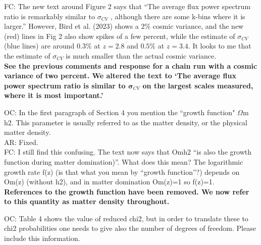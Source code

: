 \documentclass[12pt]{article}
\begin{document}
FC: The new text around Figure 2 says that “The average flux power spectrum ratio is remarkably similar to $\sigma_{CV}$ , although there are some k-bins where it is larger.” However, Bird et al. (2023) shows a $2\%$ cosmic variance, and the new (red) lines in Fig 2 also show spikes of a few percent, while the estimate of $\sigma_{CV}$ (blue lines) are around $0.3\%$ at $z=2.8$ and $0.5\%$ at $z=3.4$. It looks to me that the estimate of $\sigma_{CV}$ is much smaller than the actual cosmic variance.\\

\textbf{See the previous comments and response for a chain run with a cosmic variance of two percent. We altered the text to `The average flux power spectrum ratio is similar to $\boldsymbol{\sigma}_{CV}$ on the largest scales measured, where it is most important.'}\\

\hrulefill \newline

OC: In the first paragraph of Section 4 you mention the “growth function" $\Omega$m h2. This parameter is usually referred to as the matter density, or the physical matter density.\\

AR: Fixed.\\

FC: I still find this confusing. The text now says that Omh2 “is also the growth function during matter domination)”. What does this mean? The logarithmic growth rate f(z) (is that what you mean by “growth function”?) depends on Om(z) (without h2), and in matter domination Om(z)=1 so f(z)=1.\\

\textbf{References to the growth function have been removed. We now refer to this quantity as matter density throughout.}\\

\hrulefill \newline

OC: Table 4 shows the value of reduced chi2, but in order to translate these to chi2 probabilities one needs to give also the number of degrees of freedom. Please include this information.\\
\end{document}
